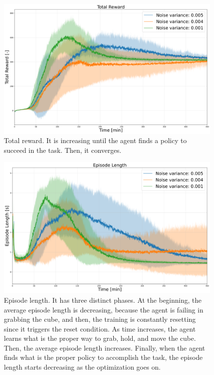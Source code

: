 \documentclass[a4paper]{article}
\begin{document}
\newpage

\begin{figure}[!hb]
    \centering
    \includegraphics[scale=0.3]{images/Total Rewardv3.png}
    \caption{Total reward. It is increasing until the agent finds a policy to succeed in the task. Then, it converges.}
\end{figure}

\vspace{2cm}

\begin{figure}[!hb]
    \centering
    \includegraphics[scale=0.3]{images/Episode Lengthv3.png}
    \caption{Episode length. It has three distinct phases. At the beginning, the average episode length is decreasing, because the agent is failing in grabbing the cube, and then, the training is constantly resetting since it triggers the reset condition. As time increases, the agent learns what is the proper way to grab, hold, and move the cube. Then, the average episode length increases. Finally, when the agent finds what is the proper policy to accomplish the task, the episode length starts decreasing as the optimization goes on.}
\end{figure}
\end{document}
